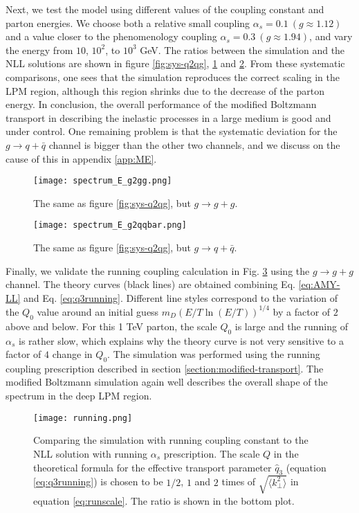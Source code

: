 Next, we test the model using different values of the coupling constant and parton energies.
We choose both a relative small coupling $\alpha_s = 0.1~(g \approx 1.12)$ and a value closer to the phenomenology coupling $\alpha_s = 0.3~(g \approx 1.94)$, and vary the energy from $10$, $10^2$, to $10^3$ GeV.
The ratios between the simulation and the NLL solutions are shown in figure \ref{fig:sys-q2qg}, \ref{fig:sys-g2gg} and \ref{fig:sys-g2qqbar}.
From these systematic comparisons,
one sees that the simulation reproduces the correct scaling in the LPM region, although this region shrinks due to the decrease of the parton energy.
In conclusion, the overall performance of the modified Boltzmann transport in describing the inelastic processes in a large medium is good and under control.
One remaining problem is that the systematic deviation for the $g\rightarrow q+\bar{q}$ channel is bigger than the other two channels, and we discuss on the cause of this in appendix \ref{app:ME}.

\begin{figure}
\singlespacing
\centering
\texttt{[image: spectrum\_E\_g2gg.png]}
\caption{The same as figure \ref{fig:sys-q2qg}, but $g \rightarrow g + g$.}
\label{fig:sys-g2gg}
\end{figure}

\begin{figure}
\singlespacing
\centering
\texttt{[image: spectrum\_E\_g2qqbar.png]}
\caption{The same as figure \ref{fig:sys-q2qg}, but $g \rightarrow q + \bar{q}$.}
\label{fig:sys-g2qqbar}
\end{figure}

Finally, we validate the running coupling calculation in Fig. \ref{fig:running} using the $g\rightarrow g+g$ channel.
The theory curves (black lines) are obtained combining Eq. \ref{eq:AMY-LL} and Eq. \ref{eq:q3running}.
Different line styles correspond to the variation of the $Q_0$ value around an initial guess $m_D (E/T \ln(E/T) )^{1/4}$ by a factor of $2$ above and below.
For this 1 TeV parton, the scale $Q_0$ is large and the running of $\alpha_s$ is rather slow, which explains why the theory curve is not very sensitive to a factor of $4$ change in $Q_0$.
The simulation was performed using the running coupling prescription described in section \ref{section:modified-transport}.
The modified Boltzmann simulation again well describes the overall shape of the spectrum in the deep LPM region. 

\begin{figure}
\singlespacing
\centering
\texttt{[image: running.png]}
\caption[Comparing the simulation with running coupling constant to]{Comparing the simulation with running coupling constant to the NLL solution with running $\alpha_s$ prescription.
The scale $Q$ in the theoretical formula for the effective transport parameter $\hat{q}_3$ (equation \ref{eq:q3running}) is chosen to be $1/2$, $1$ and $2$ times of $\sqrt{\langle k_\perp^2\rangle}$ in equation \ref{eq:runscale}.
The ratio is shown in the bottom plot.}
\label{fig:running}
\end{figure}

